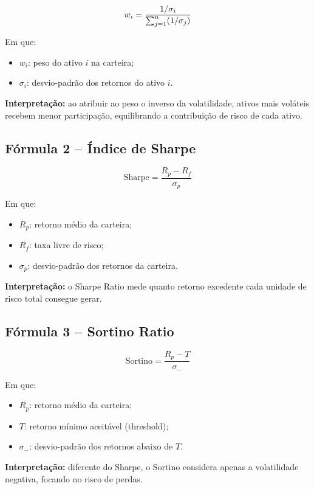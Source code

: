 \begin{equation}
\begin{equation}
w_i = \frac{1/\sigma_i}{\sum_{j=1}^{n}(1/\sigma_j)}
\end{equation}

Em que:
\begin{itemize}
    \item $w_i$: peso do ativo $i$ na carteira;
    \item $\sigma_i$: desvio-padrão dos retornos do ativo $i$.
\end{itemize}

\textbf{Interpretação:} ao atribuir ao peso o inverso da volatilidade, ativos mais voláteis recebem menor participação, equilibrando a contribuição de risco de cada ativo.

\subsection{Fórmula 2 -- Índice de Sharpe}

\begin{equation}
\text{Sharpe} = \frac{R_p - R_f}{\sigma_p}
\end{equation}

Em que:
\begin{itemize}
    \item $R_p$: retorno médio da carteira;
    \item $R_f$: taxa livre de risco;
    \item $\sigma_p$: desvio-padrão dos retornos da carteira.
\end{itemize}

\textbf{Interpretação:} o Sharpe Ratio mede quanto retorno excedente cada unidade de risco total consegue gerar.

\subsection{Fórmula 3 -- Sortino Ratio}

\begin{equation}
\text{Sortino} = \frac{R_p - T}{\sigma_-}
\end{equation}

Em que:
\begin{itemize}
    \item $R_p$: retorno médio da carteira;
    \item $T$: retorno mínimo aceitável (threshold);
    \item $\sigma_-$: desvio-padrão dos retornos abaixo de $T$.
\end{itemize}

\textbf{Interpretação:} diferente do Sharpe, o Sortino considera apenas a volatilidade negativa, focando no risco de perdas.